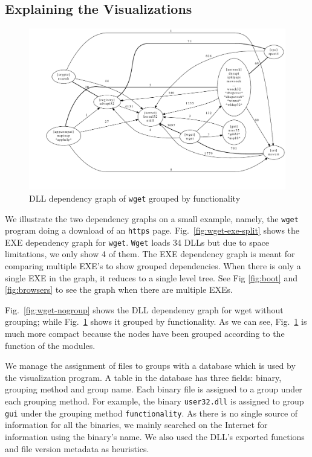 \subsection{Explaining the Visualizations}

\begin{figure}[thb]
\centering
\includegraphics[width=1.0\columnwidth]{depvis/wget-function.pdf}
\caption{DLL dependency graph of {\tt wget} grouped by functionality}
\label{fig:wget-function}
\end{figure}

We illustrate the two dependency graphs on a small example, namely, the
{\tt wget} program doing a download of an {\tt https} page.
Fig.~\ref{fig:wget-exe-split} shows the EXE dependency graph for {\tt wget}.
{\tt Wget} loads 34 DLLs but due to space limitations, we only show 4 of
them.
The EXE dependency graph is meant for comparing multiple EXE's to show
grouped dependencies.
When there is only a single EXE in the graph, it reduces to a single level
tree. See Fig \ref{fig:boot} and \ref{fig:browsers} to see the graph
when there are multiple EXEs.

Fig.~\ref{fig:wget-nogroup} shows the DLL
dependency graph for wget without grouping; while
Fig.~\ref{fig:wget-function} shows it grouped by functionality.
As we can see, Fig.~\ref{fig:wget-function} is much more compact
because the nodes have been grouped according to the function of the modules.

We manage the assignment of files to groups with a data\-base which is
used by the visualization program.
A table in the database has three fields: binary,
grouping method and group name.
Each binary file is assigned to a group under each grouping method.
For example, the binary {\tt user32.dll} is assigned to group {\tt gui} under
the grouping method {\tt functi\-onality}.
As there is no single source of information for all the binaries, we mainly
searched on the Internet for information using the binary's name.
We also used the DLL's exported functions and file version metadata
as heuristics.


